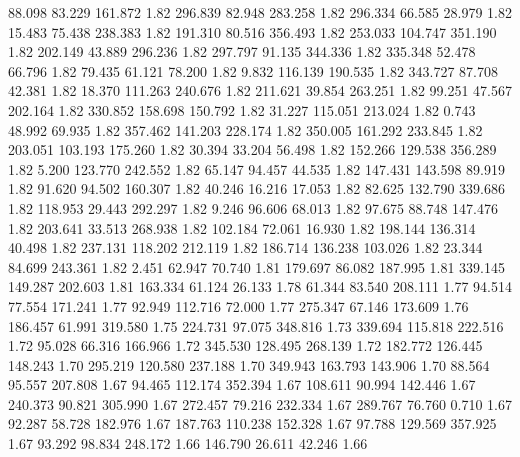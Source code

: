   88.098   83.229  161.872         1.82
 296.839   82.948  283.258         1.82
 296.334   66.585   28.979         1.82
  15.483   75.438  238.383         1.82
 191.310   80.516  356.493         1.82
 253.033  104.747  351.190         1.82
 202.149   43.889  296.236         1.82
 297.797   91.135  344.336         1.82
 335.348   52.478   66.796         1.82
  79.435   61.121   78.200         1.82
   9.832  116.139  190.535         1.82
 343.727   87.708   42.381         1.82
  18.370  111.263  240.676         1.82
 211.621   39.854  263.251         1.82
  99.251   47.567  202.164         1.82
 330.852  158.698  150.792         1.82
  31.227  115.051  213.024         1.82
   0.743   48.992   69.935         1.82
 357.462  141.203  228.174         1.82
 350.005  161.292  233.845         1.82
 203.051  103.193  175.260         1.82
  30.394   33.204   56.498         1.82
 152.266  129.538  356.289         1.82
   5.200  123.770  242.552         1.82
  65.147   94.457   44.535         1.82
 147.431  143.598   89.919         1.82
  91.620   94.502  160.307         1.82
  40.246   16.216   17.053         1.82
  82.625  132.790  339.686         1.82
 118.953   29.443  292.297         1.82
   9.246   96.606   68.013         1.82
  97.675   88.748  147.476         1.82
 203.641   33.513  268.938         1.82
 102.184   72.061   16.930         1.82
 198.144  136.314   40.498         1.82
 237.131  118.202  212.119         1.82
 186.714  136.238  103.026         1.82
  23.344   84.699  243.361         1.82
   2.451   62.947   70.740         1.81
 179.697   86.082  187.995         1.81
 339.145  149.287  202.603         1.81
 163.334   61.124   26.133         1.78
  61.344   83.540  208.111         1.77
  94.514   77.554  171.241         1.77
  92.949  112.716   72.000         1.77
 275.347   67.146  173.609         1.76
 186.457   61.991  319.580         1.75
 224.731   97.075  348.816         1.73
 339.694  115.818  222.516         1.72
  95.028   66.316  166.966         1.72
 345.530  128.495  268.139         1.72
 182.772  126.445  148.243         1.70
 295.219  120.580  237.188         1.70
 349.943  163.793  143.906         1.70
  88.564   95.557  207.808         1.67
  94.465  112.174  352.394         1.67
 108.611   90.994  142.446         1.67
 240.373   90.821  305.990         1.67
 272.457   79.216  232.334         1.67
 289.767   76.760    0.710         1.67
  92.287   58.728  182.976         1.67
 187.763  110.238  152.328         1.67
  97.788  129.569  357.925         1.67
  93.292   98.834  248.172         1.66
 146.790   26.611   42.246         1.66
